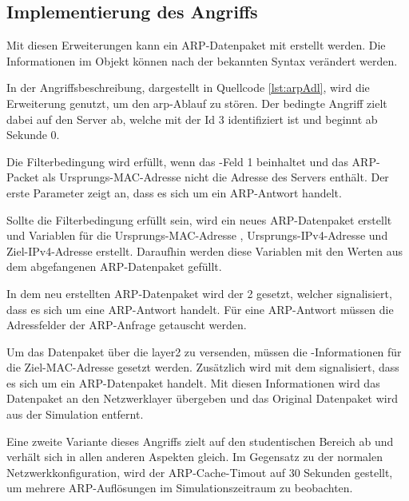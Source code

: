 \subsection{Implementierung des Angriffs}
\begin{program}[ht]
	}]{tucsnet/attacks/arpServer.adl}
	\caption{Angriffsdefinition für den ARP-Angriff auf den Server}
	\label{lst:arpAdl}
\end{program}
Mit diesen Erweiterungen kann ein ARP-Datenpaket mit  erstellt werden. Die Informationen im Objekt  können nach der bekannten Syntax verändert werden. 

In der Angriffsbeschreibung, dargestellt in Quellcode \ref{lst:arpAdl}, wird die Erweiterung genutzt, um den \gls{arp}-Ablauf zu stören. Der bedingte Angriff zielt dabei auf den Server  ab, welche mit der Id 3 identifiziert ist und beginnt ab Sekunde 0. 

Die Filterbedingung wird erfüllt, wenn das -Feld 1 beinhaltet und das ARP-Packet als Ursprungs-MAC-Adresse nicht die Adresse des Servers enthält. Der erste Parameter zeigt an, dass es sich um ein ARP-Antwort \cite{RFC0826} handelt. 

Sollte die Filterbedingung erfüllt sein, wird ein neues ARP-Datenpaket  erstellt und Variablen für die Ursprungs-MAC-Adresse , Ursprungs-IPv4-Adresse  und Ziel-IPv4-Adresse  erstellt. Daraufhin werden diese Variablen mit den Werten aus dem abgefangenen ARP-Datenpaket gefüllt.

In dem neu erstellten ARP-Datenpaket wird der  2 gesetzt, welcher signalisiert, dass es sich um eine ARP-Antwort \cite{RFC0826} handelt. Für eine ARP-Antwort müssen die Adressfelder der ARP-Anfrage getauscht werden.

Um das Datenpaket über die \gls{layer2} zu versenden, müssen die -Informationen für die Ziel-MAC-Adresse gesetzt werden. Zusätzlich wird mit dem  signalisiert, dass es sich um ein ARP-Datenpaket \cite{RFC1700, RFC3232} handelt. Mit diesen Informationen wird das Datenpaket an den Netzwerklayer übergeben und das Original Datenpaket wird aus der Simulation entfernt.

Eine zweite Variante dieses Angriffs zielt auf den studentischen Bereich ab und verhält sich in allen anderen Aspekten gleich. Im Gegensatz zu der normalen Netzwerkkonfiguration, wird der ARP-Cache-Timout auf 30 Sekunden gestellt, um mehrere ARP-Auflösungen im Simulationszeitraum zu beobachten.

